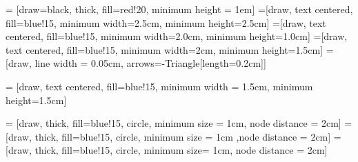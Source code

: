 
 = [draw=black, thick, fill=red!20, minimum height = 1em]
 =[draw, text centered, fill=blue!15, minimum width=2.5cm, minimum height=2.5cm]
 =[draw, text centered, fill=blue!15, minimum width=2.0cm, minimum height=1.0cm]
 =[draw, text centered, fill=blue!15, minimum width=2cm, minimum height=1.5cm]
 = [draw, line width = 0.05cm, arrows={-Triangle[length=0.2cm]}]

 = [draw, text centered, fill=blue!15, minimum width = 1.5cm,
minimum height=1.5cm]

 = [draw, thick, fill=blue!15, circle, minimum size = 1cm, node distance = 2cm]
 = [draw, thick, fill=blue!15, circle, minimum size = 1cm ,node distance = 2cm]
 = [draw, thick, fill=blue!15, circle, minimum size= 1cm, node distance = 2cm]

